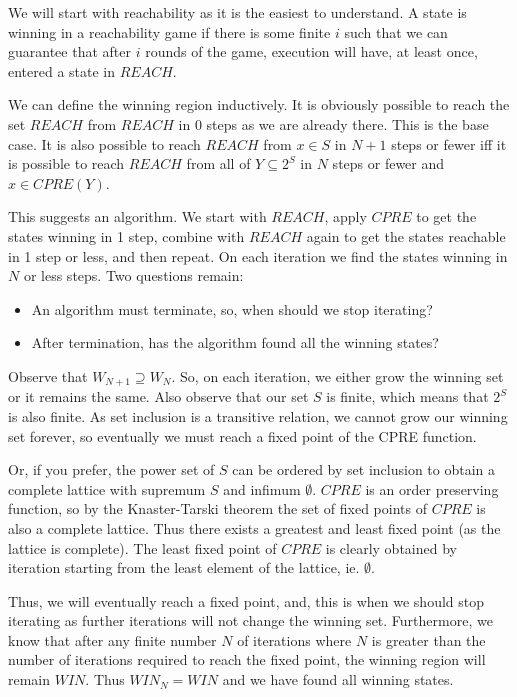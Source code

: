 \documentclass{book}
\theoremstyle{definition}
\begin{document}
We will start with reachability as it is the easiest to understand. A state is winning in a reachability game if there is some finite $i$ such that we can guarantee that after $i$ rounds of the game, execution will have, at least once, entered a state in $REACH$.

We can define the winning region inductively. It is obviously possible to reach the set $REACH$ from $REACH$ in 0 steps as we are already there. This is the base case. It is also possible to reach $REACH$ from $x \in S$ in $N + 1$ steps or fewer iff it is possible to reach $REACH$ from all of $Y \subseteq 2^S$ in $N$ steps or fewer and $x \in CPRE(Y)$.

This suggests an algorithm. We start with $REACH$, apply $CPRE$ to get the states winning in 1 step, combine with $REACH$ again to get the states reachable in 1 step or less, and then repeat. On each iteration we find the states winning in $N$ or less steps. Two questions remain: 

\begin{itemize}
    \item An algorithm must terminate, so, when should we stop iterating?
    \item After termination, has the algorithm found all the winning states?
\end{itemize}

Observe that $W_{N+1} \supseteq W_N$. So, on each iteration, we either grow the winning set or it remains the same. Also observe that our set $S$ is finite, which means that $2^S$ is also finite. As set inclusion is a transitive relation, we cannot grow our winning set forever, so eventually we must reach a fixed point of the CPRE function. 

Or, if you prefer, the power set of $S$ can be ordered by set inclusion to obtain a complete lattice with supremum $S$ and infimum $\emptyset$. $CPRE$ is an order preserving function, so by the Knaster-Tarski theorem the set of fixed points of $CPRE$ is also a complete lattice. Thus there exists a greatest and least fixed point (as the lattice is complete). The least fixed point of $CPRE$ is clearly obtained by iteration starting from the least element of the lattice, ie. $\emptyset$.

Thus, we will eventually reach a fixed point, and, this is when we should stop iterating as further iterations will not change the winning set. Furthermore, we know that after any finite number $N$ of iterations where $N$ is greater than the number of iterations required to reach the fixed point, the winning region will remain $WIN$. Thus $WIN_N = WIN$ and we have found all winning states.
\end{document}
